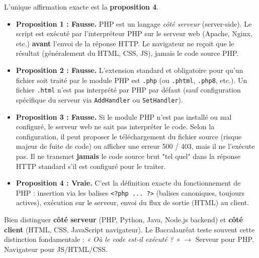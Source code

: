 \documentclass[11pt]{article}
\begin{document}
\begin{corrige}
L'unique affirmation exacte est la \textbf{proposition 4}.

\begin{itemize}
    \item \textbf{Proposition 1 : Fausse.} PHP est un langage \emph{côté serveur} (server-side). Le script est exécuté par l'interpréteur PHP sur le serveur web (Apache, Nginx, etc.) \textbf{avant} l'envoi de la réponse HTTP. Le navigateur ne reçoit que le résultat (généralement du HTML, CSS, JS), jamais le code source PHP.
    \item \textbf{Proposition 2 : Fausse.} L'extension standard et obligatoire pour qu'un fichier soit traité par le module PHP est \texttt{.php} (ou \texttt{.phtml}, \texttt{.php8}, etc.). Un fichier \texttt{.html} n'est pas interprété par PHP par défaut (sauf configuration spécifique du serveur via \texttt{AddHandler} ou \texttt{SetHandler}).
    \item \textbf{Proposition 3 : Fausse.} Si le module PHP n'est pas installé ou mal configuré, le serveur web ne sait pas interpréter le code. Selon la configuration, il peut proposer le téléchargement du fichier source (risque majeur de fuite de code) ou afficher une erreur 500 / 403, mais il ne l'exécute pas. Il ne transmet \textbf{jamais} le code source brut "tel quel" dans la réponse HTTP standard s'il est configuré pour le traiter.
    \item \textbf{Proposition 4 : Vraie.} C'est la définition exacte du fonctionnement de PHP : insertion via les balises \texttt{<?php ... ?>} (balises canoniques, toujours actives), exécution sur le serveur, envoi du flux de sortie (HTML) au client.
\end{itemize}

\begin{attention}
Bien distinguer \textbf{côté serveur} (PHP, Python, Java, Node.js backend) et \textbf{côté client} (HTML, CSS, JavaScript navigateur). Le Baccalauréat teste souvent cette distinction fondamentale : \emph{« Où le code est-il exécuté ? »} $\rightarrow$ Serveur pour PHP, Navigateur pour JS/HTML/CSS.
\end{attention}
\end{corrige}
\end{document}
